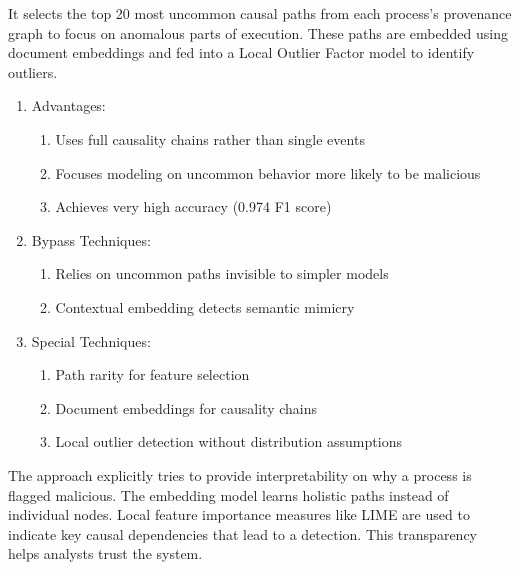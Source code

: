 \documentclass{article}
\begin{document}
It selects the top 20 most uncommon causal paths from each process's provenance graph to focus on anomalous parts of execution. These paths are embedded using document embeddings and fed into a Local Outlier Factor model to identify outliers.

\begin{enumerate}
\item Advantages:

  \begin{enumerate}
  \item Uses full causality chains rather than single events
  \item Focuses modeling on uncommon behavior more likely to be malicious
  \item Achieves very high accuracy (0.974 F1 score)
  \end{enumerate}

\item Bypass Techniques:

  \begin{enumerate}
  \item Relies on uncommon paths invisible to simpler models
  \item Contextual embedding detects semantic mimicry
  \end{enumerate}

\item Special Techniques:

  \begin{enumerate}
  \item Path rarity for feature selection
  \item Document embeddings for causality chains
  \item Local outlier detection without distribution assumptions
  \end{enumerate}
\end{enumerate}

The approach explicitly tries to provide interpretability on why a process is flagged malicious. The embedding model learns holistic paths instead of individual nodes. Local feature importance measures like LIME are used to indicate key causal dependencies that lead to a detection. This transparency helps analysts trust the system.
\end{document}
